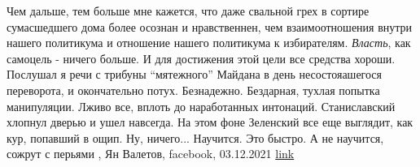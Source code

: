 Чем дальше, тем больше мне кажется, что даже свальной грех в сортире
сумасшедшего дома более осознан и нравственнен, чем взаимоотношения внутри
нашего политикума и отношение нашего политикума к избирателям.  \emph{Власть}, как
самоцель - ничего больше. И для достижения этой цели все средства хороши.
Послушал я речи с трибуны \enquote{мятежного} Майдана в день несостояашегося
переворота, и окончательно потух. Безнадежно. Бездарная, тухлая попытка
манипуляции. Лживо все, вплоть до наработанных интонаций. Станиславский хлопнул
дверью и ушел навсегда.  На этом фоне Зеленский все еще выглядит, как кур,
попавший в ощип. Ну, ничего... Научится. Это быстро. А не научится, сожрут с
перьями
, Ян Валетов, facebook, 03.12.2021
\href{https://www.facebook.com/ian.valietov/posts/4655017341200725}{link}

